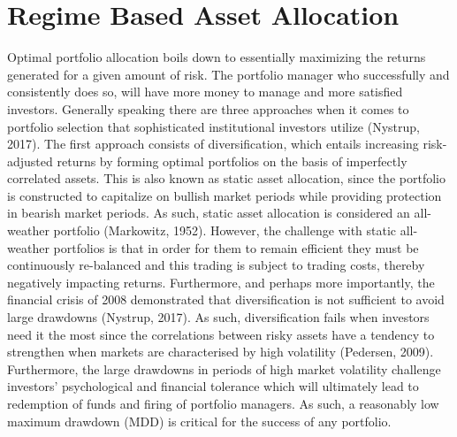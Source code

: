 \newpage

\section{Regime Based Asset Allocation}
Optimal portfolio allocation boils down to essentially maximizing the returns generated for a given amount of risk. The portfolio manager who successfully and consistently does so, will have more money to manage and more satisfied investors. Generally speaking there are three approaches when it comes to portfolio selection that sophisticated institutional investors utilize (Nystrup, 2017). The first approach consists of diversification, which entails increasing risk-adjusted returns by forming optimal portfolios on the basis of imperfectly correlated assets. This is also known as static asset allocation, since the portfolio is constructed to capitalize on bullish market periods while providing protection in bearish market periods. As such, static asset allocation is considered an all-weather portfolio (Markowitz, 1952). However, the challenge with static all-weather portfolios is that in order for them to remain efficient they must be continuously re-balanced and this trading is subject to trading costs, thereby negatively impacting returns. Furthermore, and perhaps more importantly, the financial crisis of 2008 demonstrated that diversification is not sufficient to avoid large drawdowns (Nystrup, 2017). As such, diversification fails when investors need it the most since the correlations between risky assets have a tendency to strengthen when markets are characterised by high volatility (Pedersen, 2009). Furthermore, the large drawdowns in periods of high market volatility challenge investors' psychological and financial tolerance which will ultimately lead to redemption of funds and firing of portfolio managers. As such, a reasonably low maximum drawdown (MDD) is critical for the success of any portfolio.

